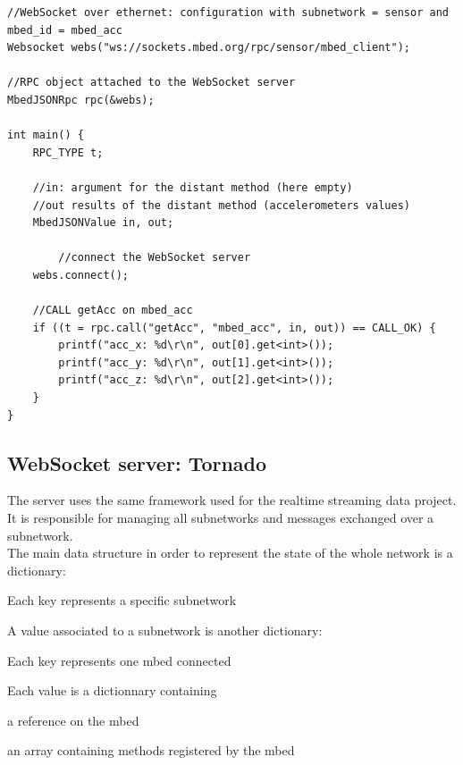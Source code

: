 \documentclass[pdftex,10pt,a4paper]{report}
\newenvironment{packed_item}{
\begin{itemize}
  \setlength{\itemsep}{1pt}
  \setlength{\parskip}{0pt}
  \setlength{\parsep}{0pt}
}{\end{itemize}}
\begin{document}
\begin{lstlisting}[label=Client which calls a distant method,caption=Client which calls a distant method]
//WebSocket over ethernet: configuration with subnetwork = sensor and mbed_id = mbed_acc
Websocket webs("ws://sockets.mbed.org/rpc/sensor/mbed_client");

//RPC object attached to the WebSocket server
MbedJSONRpc rpc(&webs);

int main() {
    RPC_TYPE t;
    
    //in: argument for the distant method (here empty)
    //out results of the distant method (accelerometers values)
    MbedJSONValue in, out;

		//connect the WebSocket server
    webs.connect();

    //CALL getAcc on mbed_acc
    if ((t = rpc.call("getAcc", "mbed_acc", in, out)) == CALL_OK) {
        printf("acc_x: %d\r\n", out[0].get<int>());
        printf("acc_y: %d\r\n", out[1].get<int>());
        printf("acc_z: %d\r\n", out[2].get<int>());
    }
}
\end{lstlisting}

\subsection{WebSocket server: Tornado}
The server uses the same framework used for the realtime streaming data project. It is responsible for managing all subnetworks and messages exchanged over a subnetwork. \\


The main data structure in order to represent the state of the whole network is a dictionary:
\begin{packed_item}
	\item Each key represents a specific subnetwork
	\item A value associated to a subnetwork is another dictionary:
		\begin{packed_item}
			\item Each key represents one mbed connected
			\item Each value is a dictionnary containing
			\begin{packed_item}
				\item a reference on the mbed
				\item an array containing methods registered by the mbed
			\end{packed_item}
		\end{packed_item}
\end{packed_item}
\end{document}
